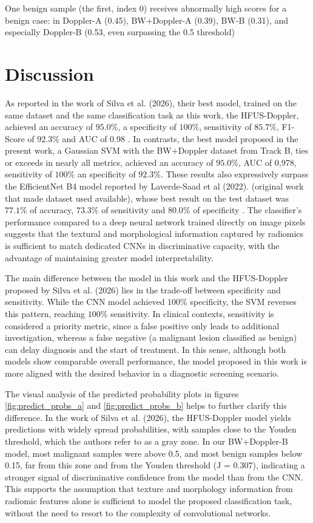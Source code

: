 \documentclass[12pt,a4paper]{article}
\begin{document}
One benign sample (the first, index 0) receives abnormally high scores for a benign case: in Doppler-A (0.45), BW+Doppler-A (0.39), BW-B (0.31), and especially Doppler-B (0.53, even surpassing the 0.5 threshold)

\section{Discussion}

As reported in the work of Silva et al. (2026), their best model, trained on the same dataset and the same classification task as this work, the HFUS-Doppler, achieved an accuracy of $95.0\%$, a specificity of $100\%$, sensitivity of $85.7\%$, F1-Score of $92.3\%$ and AUC of 0.98 \cite{daSilva2026}. In contrasts, the best model proposed in the present work, a Gaussian SVM with the BW+Doppler dataset from Track B, ties or exceeds in nearly all metrics, achieved an accuracy of  $95.0\%$, AUC of 0,978, sensitivity of $100\%$ an specificity of $92.3\%$. These results also expressively surpass the EfficientNet B4 model reported by Laverde-Saad et al (2022). (original work that made dataset used available), whose best result on the test dataset was $77.1\%$ of accuracy, $73.3\%$ of sensitivity  and $80.0\%$ of specificity \cite{LaverdeSaad2021}. The classifier's performance compared to a deep neural network trained directly on image pixels suggests that the textural and morphological information captured by radiomics is sufficient to match dedicated CNNs in discriminative capacity, with the advantage of maintaining greater model interpretability.

The main difference between the model in this work and the HFUS-Doppler proposed by Silva et al. (2026) lies in the trade-off between specificity and sensitivity. While the CNN model achieved $100\%$ specificity, the SVM reverses this pattern, reaching $100\%$ sensitivity. In clinical contexts, sensitivity is considered a priority metric, since a false positive only leads to additional investigation, whereas a false negative (a malignant lesion classified as benign) can delay diagnosis and the start of treatment. In this sense, although both models show comparable overall performance, the model proposed in this work is more aligned with the desired behavior in a diagnostic screening scenario.

The visual analysis of the predicted probability plots in figures \ref{fig:predict_probs_a} and \ref{fig:predict_probs_b} helps to further clarify this difference. In the work of Silva et al. (2026), the HFUS-Doppler model yields predictions with widely spread probabilities, with samples close to the Youden threshold, which the authors refer to as a gray zone. In our BW+Doppler-B model, most malignant samples were above 0.5, and most benign samples below 0.15, far from this zone and from the Youden threshold (J = 0.307), indicating a stronger signal of discriminative confidence from the model than from the CNN. This supports the assumption that texture and morphology information from radiomic features alone is sufficient to model the proposed classification task, without the need to resort to the complexity of convolutional networks.
\end{document}

